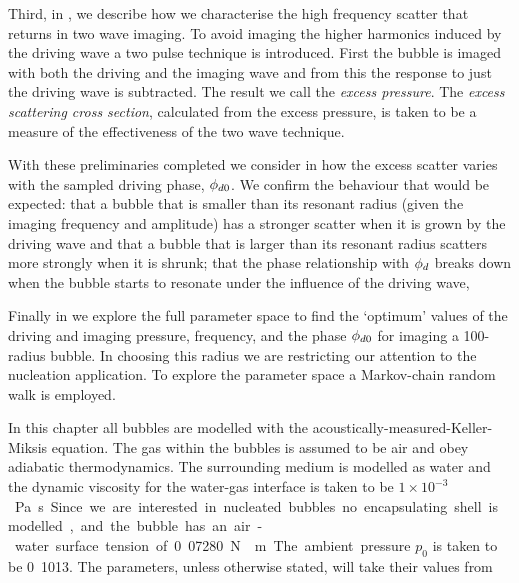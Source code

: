Third, in  ,
we describe how we characterise the high frequency scatter that returns in two wave imaging.
To avoid imaging the higher harmonics induced by the driving wave   a two pulse technique is introduced.
First the bubble is imaged with  both the driving and the imaging wave and from this the response to just the driving wave is subtracted.
The result we call the {\em excess pressure}.
The {\em excess scattering cross section}, calculated from the excess pressure, is taken to be 
a measure of the effectiveness of the two wave technique.

With these preliminaries completed we consider in  how the excess scatter
varies with the sampled driving phase, ${\phi_{d0}}$.
We confirm the behaviour that would be expected:
that a bubble that is smaller than its resonant radius (given the imaging frequency and amplitude)
has a stronger scatter when it is grown by the driving wave
and that a bubble that is larger than its resonant radius scatters more strongly when it is shrunk;
that the phase relationship with ${\phi_d}$ breaks down when the 
bubble starts to resonate under the influence of the driving wave,

Finally in  we explore the full  parameter space 
to find the `optimum' values of the driving and imaging pressure, frequency, 
and the phase ${\phi_{d0}}$ for imaging a \unit{100}\nano\metre-radius bubble.
In choosing this radius we are restricting our attention to the nucleation application.
To explore the parameter space a Markov-chain random walk is employed.



In this chapter all bubbles are modelled with the acoustically-measured-Keller-Miksis equation.
The gas within the bubbles is assumed to be air and obey adiabatic thermodynamics.
The surrounding medium is modelled as water and the dynamic viscosity for the water-gas interface
is taken to be  \unit{$1\times10^{-3}$}\pascal\second.
Since we are interested in nucleated bubbles no encapsulating shell is modelled,
and the bubble has an air-water surface tension of  \unit{0.07280}\newton\reciprocal\metre.
The ambient pressure $p_0$ is taken to be \unit{0.1013}\mega\pascal.
The parameters, unless otherwise stated, will take their values from 

